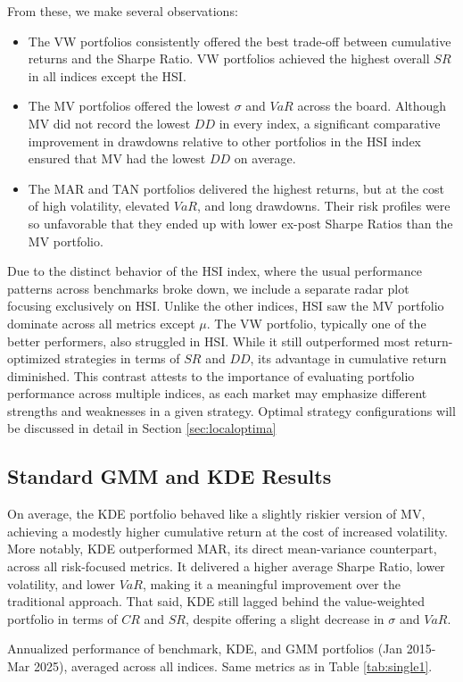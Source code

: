From these, we make several observations:
\begin{itemize}
\item The VW portfolios consistently offered the best trade-off between cumulative returns and the Sharpe Ratio. VW portfolios achieved the highest overall $SR$ in all indices except the HSI.
\item The MV portfolios offered the lowest $\sigma$ and $VaR$ across the board. Although MV did not record the lowest $DD$ in every index, a significant comparative improvement in drawdowns relative to other portfolios in the HSI index ensured that MV had the lowest $DD$ on average.
\item The MAR and TAN portfolios delivered the highest returns, but at the cost of high volatility, elevated $VaR$, and long drawdowns. Their risk profiles were so unfavorable that they ended up with lower ex-post Sharpe Ratios than the MV portfolio.
\end{itemize}
  
Due to the distinct behavior of the HSI index, where the usual performance patterns across benchmarks broke down, we include a separate radar plot focusing exclusively on HSI. Unlike the other indices, HSI saw the MV portfolio dominate across all metrics except $\mu$. The VW portfolio, typically one of the better performers, also struggled in HSI. While it still outperformed most return-optimized strategies in terms of $SR$ and $DD$, its advantage in cumulative return diminished. This contrast attests to the importance of evaluating portfolio performance across multiple indices, as each market may emphasize different strengths and weaknesses in a given strategy. Optimal strategy configurations will be discussed in detail in Section \ref{sec:localoptima}

\subsection{Standard GMM and KDE Results}
On average, the KDE portfolio behaved like a slightly riskier version of MV, achieving a modestly higher cumulative return at the cost of increased volatility. More notably, KDE outperformed MAR, its direct mean-variance counterpart, across all risk-focused metrics. It delivered a higher average Sharpe Ratio, lower volatility, and lower $VaR$, making it a meaningful improvement over the traditional approach. That said, KDE still lagged behind the value-weighted portfolio in terms of $CR$ and $SR$, despite offering a slight decrease in $\sigma$ and $VaR$.
\vspace{5mm}
\begin{table}[H]
  \centering
  
  \caption[Benchmark vs. KDE/GMM performance]{Annualized performance of benchmark, KDE, and GMM portfolios (Jan 2015-Mar 2025), averaged across all indices. Same metrics as in Table \ref{tab:single1}.}
  \label{tab:single2}
\end{table}

